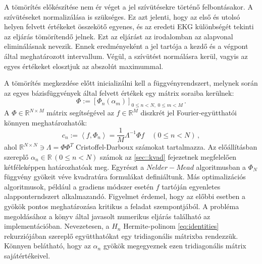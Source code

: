 \documentclass[oneside,titlepage,12pt,a4paper]{report}
\begin{document}
A tömörítés előkészítése nem ér véget a jel szívütésekre történő felbontásakor. A szívütéseket normalizálása is szükséges. Ez azt jelenti, hogy az első és utolsó helyen felvett értékeket összekötő egyenes, és az eredeti EKG különbségét tekinti az eljárás tömörítendő jelnek. Ezt az eljárást az irodalomban az alapvonal eliminálásnak nevezik. Ennek eredményeként a jel tartója a kezdő és a végpont által meghatározott intervallum. Végül, a szívütést normálásra kerül, vagyis az egyes értékeket 
elosztjuk az abszolút maximummal. \par
	A tömörítés megkezdése előtt inicializálni kell a függvényrendszert, 
melynek során az egyes bázisfüggvények által felvett értékek egy mátrix soraiba kerülnek: 
\begin{equation*}
	\Phi:=\left[\Phi_n(\alpha_m)\right]_{0\leq n < N,\;0\leq m < M}\,.
	\label{eq:phi_matrix}
\end{equation*}
A $\Phi\in\mathbb{R}^{N\times M}$ mátrix segítségével az $f\in\mathbb{R}^M$ diszkrét jel Fourier-együtthatói könnyen meghatározhatók:
\begin{equation*}
	c_n:=\left\langle f, \Phi_n \right\rangle=\frac{1}{M} \Lambda^{-1} \Phi f \quad (0\leq n < N)\,,
	\label{eq:phi_coeffs}
\end{equation*}
ahol $\mathbb{R}^{N\times N}\ni\Lambda=\Phi \Phi^T$ Cristoffel-Darboux számokat tartalmazza. Az előállításban szereplő $\alpha_n\in\mathbb{R}\, (0\leq n < N)$ számok az \ref{sec::kvad} fejezetnek megfelelően kétféleképpen határozhatóak meg. Egyrészt a $Nelder-Mead$ algoritmusban a $\Phi_N$ függvény gyökeit véve kvadratúra formulákat definiáltunk. Más optimalizációs algoritmusok, például a gradiens módszer esetén $f$ tartóján egyenletes alapponterndszert alkalmazandó. Figyelmet érdemel, hogy az előbbi esetben a gyökök pontos meghatározása kritikus a feladat szempontjából. A probléma megoldásához a \cite{gautschi} könyv által javasolt numerikus eljárás található az implementációban. Nevezetesen, a $H_n$ Hermite-polinom \eqref{eq:identities} rekurziójában szereplő együtthatókat egy tridiagonális mátrixba rendezzük. Könnyen belátható, hogy az $\alpha_n$ gyökök megegyeznek ezen tridiagonális mátrix sajátértékeivel.  \par
\end{document}
